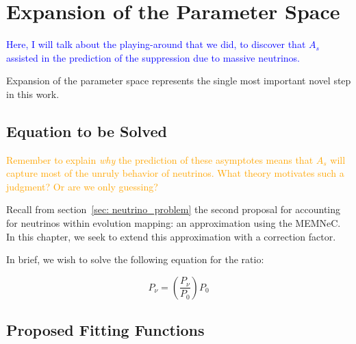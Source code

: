 \chapter{Expansion of the Parameter Space}
\label{chap: A_s}


\textcolor{blue}{Here, I will talk about the playing-around that we did, to 
discover that
$A_s$ assisted in the prediction of the suppression due to massive neutrinos.}

Expansion of the parameter space represents the single most important novel
step in this work.



\section{Equation to be Solved}


\textcolor{orange}{Remember to explain \textit{why} the prediction of these 
asymptotes means that $A_s$ will capture most of the unruly behavior of 
neutrinos. What theory motivates such a judgment? Or are we only guessing?}

Recall from section~\ref{sec: neutrino_problem} the second
proposal for accounting for neutrinos within evolution mapping: an
approximation using the MEMNeC. In this chapter, we seek to extend this approximation with a correction factor.

In brief, we wish to solve the following equation for the ratio:

\begin{equation}
P_\nu = \left( \frac{P_\nu}{P_0} \right) P_0
\end{equation}

\section{Proposed Fitting Functions}

